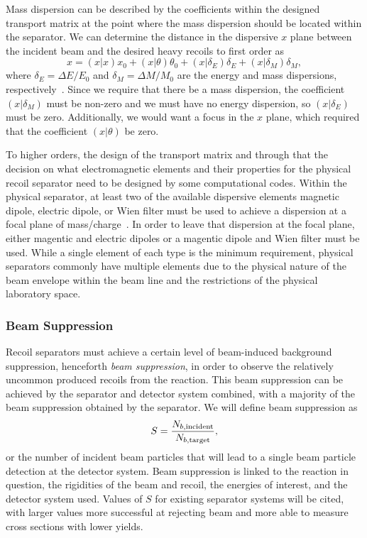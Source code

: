 Mass dispersion can be described by the coefficients within the designed
transport matrix at the point where the mass dispersion should be located
within the separator. We can determine the distance in the dispersive $x$ plane
between the incident beam and the desired heavy recoils to first order as
\[
    x = (x|x)x_0 + (x|\theta)\theta_0 + (x|\delta_E)\delta_E + (x|\delta_M)\delta_M,
\]
where $\delta_E = \Delta E/E_0$ and $\delta_M = \Delta M/M_0$ are the energy
and mass dispersions, respectively~\cite{Davids2003}. Since we require that
there be a mass dispersion, the coefficient $(x|\delta_M)$ must be non-zero and
we must have no energy dispersion, so $(x|\delta_E)$ must be zero.
Additionally, we would want a focus in the $x$ plane, which required that the
coefficient $(x|\theta)$ be zero.

To higher orders, the design of the transport matrix and through that the
decision on what electromagnetic elements and their properties for the physical
recoil separator need to be designed by some computational codes. Within the
physical separator, at least two of the available dispersive elements magnetic
dipole, electric dipole, or Wien filter must be used to achieve a dispersion at
a focal plane of mass/charge~\cite{Davids2003}. In order to leave that
dispersion at the focal plane, either magentic and electric dipoles or a
magentic dipole and Wien filter must be used. While a single element of each
type is the minimum requirement, physical separators commonly have multiple
elements due to the physical nature of the beam envelope within the beam line
and the restrictions of the physical laboratory space.

\subsubsection{Beam Suppression}
Recoil separators must achieve a certain level of beam-induced background
suppression, henceforth \emph{beam suppression}, in order to observe the
relatively uncommon produced recoils from the reaction. This beam suppression
can be achieved by the separator and detector system combined, with a majority
of the beam suppression obtained by the separator. We will define beam
suppression as
\[
    S = \frac{N_{b,\rm{incident}}}{N_{b,\rm{target}}},
\]
or the number of incident beam particles that will lead to a single beam
particle detection at the detector system. Beam suppression is linked to the
reaction in question, the rigidities of the beam and recoil, the energies of
interest, and the detector system used. Values of $S$ for existing separator
systems will be cited, with larger values more successful at rejecting beam and
more able to measure cross sections with lower yields.


